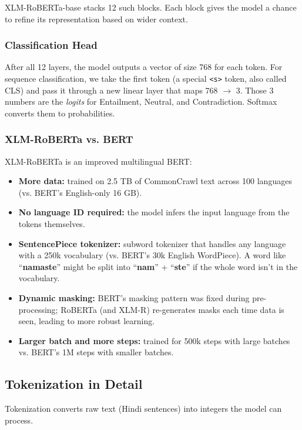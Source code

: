 XLM-RoBERTa-base stacks 12 such blocks. Each block gives the model a chance to refine its representation based on wider context.

\subsubsection{Classification Head}

After all 12 layers, the model outputs a vector of size 768 for each token. For sequence classification, we take the first token (a special \texttt{<s>} token, also called CLS) and pass it through a new linear layer that maps 768 $\rightarrow$ 3. Those 3 numbers are the \textit{logits} for Entailment, Neutral, and Contradiction. Softmax converts them to probabilities.

\subsubsection{XLM-RoBERTa vs. BERT}

XLM-RoBERTa is an improved multilingual BERT:
\begin{itemize}[nosep]
    \item \textbf{More data:} trained on 2.5 TB of CommonCrawl text across 100 languages (vs. BERT's English-only 16 GB).
    \item \textbf{No language ID required:} the model infers the input language from the tokens themselves.
    \item \textbf{SentencePiece tokenizer:} subword tokenizer that handles any language with a 250k vocabulary (vs. BERT's 30k English WordPiece). A word like ``\textsf{\textbf{namaste}}'' might be split into ``\textsf{\textbf{nam}}'' + ``\textsf{\textbf{ste}}'' if the whole word isn't in the vocabulary.
    \item \textbf{Dynamic masking:} BERT's masking pattern was fixed during pre-processing; RoBERTa (and XLM-R) re-generates masks each time data is seen, leading to more robust learning.
    \item \textbf{Larger batch and more steps:} trained for 500k steps with large batches vs. BERT's 1M steps with smaller batches.
\end{itemize}

\subsection{Tokenization in Detail}

Tokenization converts raw text (Hindi sentences) into integers the model can process.


